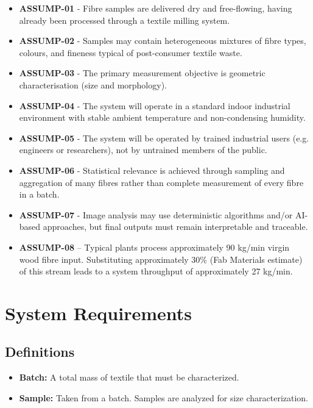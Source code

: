 \documentclass[a4paper, 12pt, english]{article}
\begin{document}
\begin{itemize}
    \item \textbf{ASSUMP-01} - Fibre samples are delivered dry and free-flowing, having already been processed through a textile milling system.
    \item \textbf{ASSUMP-02 }- Samples may contain heterogeneous mixtures of fibre types, colours, and fineness typical of post-consumer textile waste.
    \item \textbf{ASSUMP-03} - The primary measurement objective is geometric characterisation (size and morphology).
    \item \textbf{ASSUMP-04} - The system will operate in a standard indoor industrial environment with stable ambient temperature and non-condensing humidity.
    \item \textbf{ASSUMP-05} - The system will be operated by trained industrial users (e.g. engineers or researchers), not by untrained members of the public.
    \item \textbf{ASSUMP-06} - Statistical relevance is achieved through sampling and aggregation of many fibres rather than complete measurement of every fibre in a batch.
    \item \textbf{ASSUMP-07} - Image analysis may use deterministic algorithms and/or AI-based approaches, but final outputs must remain interpretable and traceable.
    \item \textbf{ASSUMP-08} – Typical plants process approximately 90 kg/min virgin wood fibre input. Substituting approximately 30\% (Fab Materials estimate) of this stream leads to a system throughput of approximately 27 kg/min.
\end{itemize}

\section{System Requirements}

\subsection{Definitions}

\begin{itemize}
    \item \textbf{Batch:} A total mass of textile that must be characterized.
    \item \textbf{Sample:} Taken from a batch. Samples are analyzed for size characterization.
\end{itemize}
\end{document}
